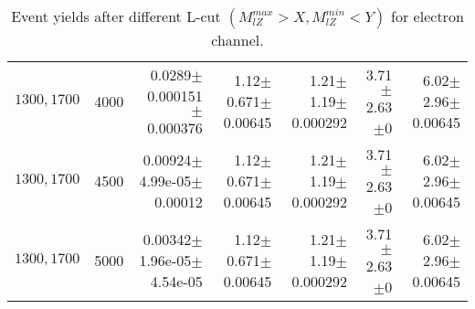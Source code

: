 \documentclass[]{article}
\begin{document}
\begin{table}
\begin{center}
{\begin{tabular}{ |r|r|r|r|r|r|r|}
$1300, 1700$ & 4000 & 0.0289$\pm$0.000151$\pm$0.000376 & 1.12$\pm$0.671$\pm$0.00645 & 1.21$\pm$1.19$\pm$0.000292 & 3.71$\pm$2.63$\pm$0 & 6.02$\pm$2.96$\pm$0.00645 \\
$1300, 1700$ & 4500 & 0.00924$\pm$4.99e-05$\pm$0.00012 & 1.12$\pm$0.671$\pm$0.00645 & 1.21$\pm$1.19$\pm$0.000292 & 3.71$\pm$2.63$\pm$0 & 6.02$\pm$2.96$\pm$0.00645 \\
$1300, 1700$ & 5000 & 0.00342$\pm$1.96e-05$\pm$4.54e-05 & 1.12$\pm$0.671$\pm$0.00645 & 1.21$\pm$1.19$\pm$0.000292 & 3.71$\pm$2.63$\pm$0 & 6.02$\pm$2.96$\pm$0.00645 \\
\hline 
\end{tabular}
}
\end{center}
\caption{Event yields after different L-cut $(M_{lZ}^{max} > X, M_{lZ}^{min} < Y)$ for electron channel.}
\end{table}
\end{document}
